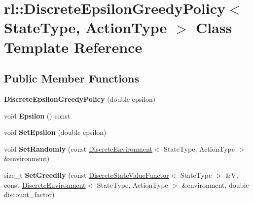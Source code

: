 \hypertarget{classrl_1_1_discrete_epsilon_greedy_policy}{}\section{rl\+:\+:Discrete\+Epsilon\+Greedy\+Policy$<$ State\+Type, Action\+Type $>$ Class Template Reference}
\label{classrl_1_1_discrete_epsilon_greedy_policy}
\subsection*{Public Member Functions}
\begin{DoxyCompactItemize}
\item 
\hypertarget{classrl_1_1_discrete_epsilon_greedy_policy_aa9d67bc59c160b060cb2fd4cc616fc66}{}\label{classrl_1_1_discrete_epsilon_greedy_policy_aa9d67bc59c160b060cb2fd4cc616fc66} 
{\bfseries Discrete\+Epsilon\+Greedy\+Policy} (double epsilon)
\item 
\hypertarget{classrl_1_1_discrete_epsilon_greedy_policy_a9559b1bfd5a8763e544a0aefd25f983d}{}\label{classrl_1_1_discrete_epsilon_greedy_policy_a9559b1bfd5a8763e544a0aefd25f983d} 
void {\bfseries Epsilon} () const
\item 
\hypertarget{classrl_1_1_discrete_epsilon_greedy_policy_aa9cef3d7f4c59af90a6f5edd8bcc8f2d}{}\label{classrl_1_1_discrete_epsilon_greedy_policy_aa9cef3d7f4c59af90a6f5edd8bcc8f2d} 
void {\bfseries Set\+Epsilon} (double epsilon)
\item 
\hypertarget{classrl_1_1_discrete_epsilon_greedy_policy_acc935a6aaee1988a35adcdcd1e5ed77c}{}\label{classrl_1_1_discrete_epsilon_greedy_policy_acc935a6aaee1988a35adcdcd1e5ed77c} 
void {\bfseries Set\+Randomly} (const \hyperlink{classrl_1_1_discrete_environment}{Discrete\+Environment}$<$ State\+Type, Action\+Type $>$ \&environment)
\item 
\hypertarget{classrl_1_1_discrete_epsilon_greedy_policy_a4fdc628bdc73cb3eda1d3b07caa52349}{}\label{classrl_1_1_discrete_epsilon_greedy_policy_a4fdc628bdc73cb3eda1d3b07caa52349} 
size\+\_\+t {\bfseries Set\+Greedily} (const \hyperlink{structrl_1_1_discrete_state_value_functor}{Discrete\+State\+Value\+Functor}$<$ State\+Type $>$ \&V, const \hyperlink{classrl_1_1_discrete_environment}{Discrete\+Environment}$<$ State\+Type, Action\+Type $>$ \&environment, double discount\+\_\+factor)
\item 
\hypertarget{classrl_1_1_discrete_epsilon_greedy_policy_a6d44e75dce975b9fa133c5c1325e2b57}{}\label{classrl_1_1_discrete_epsilon_greedy_policy_a6d44e75dce975b9fa133c5c1325e2b57} 

\end{DoxyCompactItemize}
